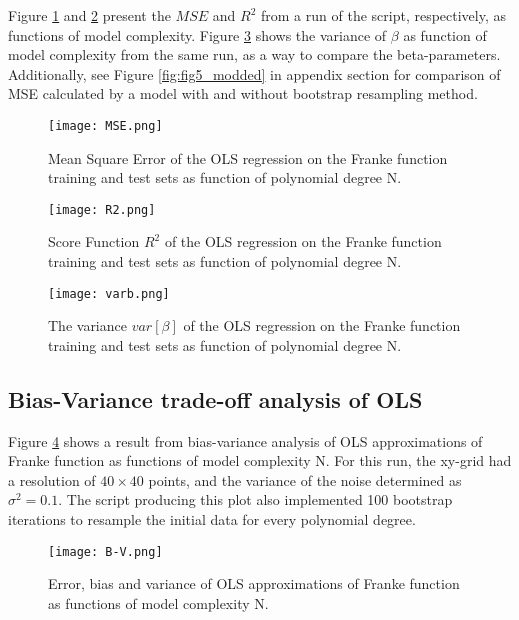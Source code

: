 \documentclass[reprint,english,notitlepage]{revtex4-1}  %
\begin{document}
Figure \ref{fig:5} and \ref{fig:6} present the $MSE$ and $R^2$ from a run of the script, respectively, as functions of model complexity. Figure \ref{fig:varb} shows the variance of $\beta$ as function of model complexity from the same run, as a way to compare the beta-parameters. Additionally, see Figure \ref{fig:fig5_modded} in appendix section for comparison of MSE calculated by a model with and without bootstrap resampling method.

\begin{figure}[h!]
    \centering
    \texttt{[image: MSE.png]}
    \caption{Mean Square Error of the OLS regression on the Franke function training and test sets as function of polynomial degree N.}
    \label{fig:5}
\end{figure}

\begin{figure}[h!]
    \centering
    \texttt{[image: R2.png]}
    \caption{Score Function $R^2$ of the OLS regression on the Franke function training and test sets as function of polynomial degree N.}
    \label{fig:6}
\end{figure}

\begin{figure}[h!]
    \centering
    \texttt{[image: varb.png]}
    \caption{The variance $var[\beta]$ of the OLS regression on the Franke function training and test sets as function of polynomial degree N.}
    \label{fig:varb}
\end{figure}

\subsection{Bias-Variance trade-off analysis of OLS}

Figure \ref{fig:bias} shows a result from bias-variance analysis of OLS approximations of Franke function as functions of model complexity N. For this run, the xy-grid had a resolution of $40\times 40$ points, and the variance of the noise determined as $\sigma^2 = 0.1$. The script producing this plot also implemented 100 bootstrap iterations to resample the initial data for every polynomial degree.

\begin{figure}[h!]
    \centering
    \texttt{[image: B-V.png]}
    \caption{Error, bias and variance of OLS approximations of Franke function as functions of model complexity N.}
    \label{fig:bias}
\end{figure}
\end{document}

